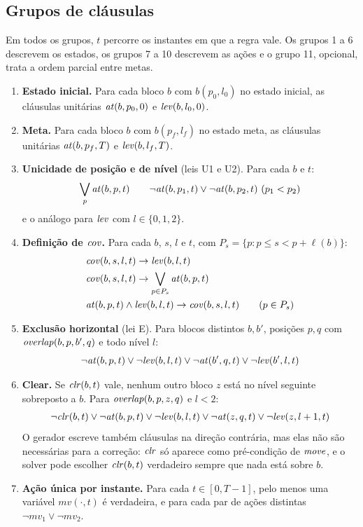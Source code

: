 \subsection{Grupos de cláusulas}

Em todos os grupos, $t$ percorre os instantes em que a regra vale. Os grupos 1 a 6 descrevem os estados, os grupos 7 a 10 descrevem as ações e o grupo 11, opcional, trata a ordem parcial entre metas.

\begin{enumerate}
\item \textbf{Estado inicial.} Para cada bloco $b$ com $b(p_0,l_0)$ no estado inicial, as cláusulas unitárias $\mathit{at}(b,p_0,0)$ e $\mathit{lev}(b,l_0,0)$.
\item \textbf{Meta.} Para cada bloco $b$ com $b(p_f,l_f)$ no estado meta, as cláusulas unitárias $\mathit{at}(b,p_f,T)$ e $\mathit{lev}(b,l_f,T)$.
\item \textbf{Unicidade de posição e de nível} (leis U1 e U2). Para cada $b$ e $t$:
\[
\bigvee_{p}\mathit{at}(b,p,t)\qquad \neg\mathit{at}(b,p_1,t)\lor\neg\mathit{at}(b,p_2,t)\ (p_1<p_2)
\]
e o análogo para $\mathit{lev}$ com $l\in\{0,1,2\}$.
\item \textbf{Definição de $\mathit{cov}$.} Para cada $b$, $s$, $l$ e $t$, com $P_s=\{p : p\le s<p+\ell(b)\}$:
\begin{align*}
&\mathit{cov}(b,s,l,t)\rightarrow\mathit{lev}(b,l,t)\\
&\mathit{cov}(b,s,l,t)\rightarrow\bigvee_{p\in P_s}\mathit{at}(b,p,t)\\
&\mathit{at}(b,p,t)\land\mathit{lev}(b,l,t)\rightarrow\mathit{cov}(b,s,l,t)\qquad(p\in P_s)
\end{align*}
\item \textbf{Exclusão horizontal} (lei E). Para blocos distintos $b,b'$, posições $p,q$ com $\mathit{overlap}(b,p,b',q)$ e todo nível $l$:
\[
\neg\mathit{at}(b,p,t)\lor\neg\mathit{lev}(b,l,t)\lor\neg\mathit{at}(b',q,t)\lor\neg\mathit{lev}(b',l,t)
\]
\item \textbf{Clear.} Se $\mathit{clr}(b,t)$ vale, nenhum outro bloco $z$ está no nível seguinte sobreposto a $b$. Para $\mathit{overlap}(b,p,z,q)$ e $l<2$:
\begin{align*}
\neg\mathit{clr}(b,t)\lor\neg\mathit{at}(b,p,t)\lor\neg\mathit{lev}(b,l,t)\lor\neg\mathit{at}(z,q,t)\lor\neg\mathit{lev}(z,l+1,t)
\end{align*}
O gerador escreve também cláusulas na direção contrária, mas elas não são necessárias para a correção: $\mathit{clr}$ só aparece como pré-condição de $\mathit{move}$, e o solver pode escolher $\mathit{clr}(b,t)$ verdadeiro sempre que nada está sobre $b$.
\item \textbf{Ação única por instante.} Para cada $t\in[0,T-1]$, pelo menos uma variável $\mathit{mv}(\cdot,t)$ é verdadeira, e para cada par de ações distintas $\neg\mathit{mv}_1\lor\neg\mathit{mv}_2$.

\end{enumerate}
